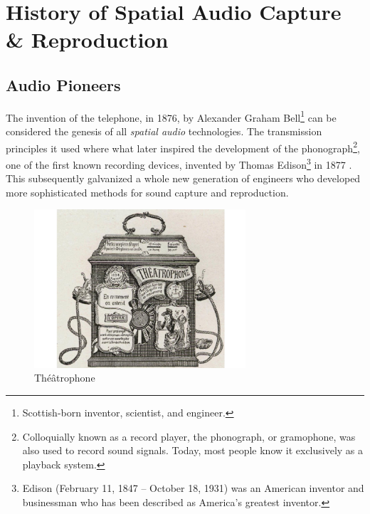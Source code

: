 \section{History of Spatial Audio Capture \& Reproduction}

\subsection{Audio Pioneers} \label{subsec:audio_pioneers}

The invention of the telephone, in 1876, by Alexander Graham Bell\footnote{Scottish-born inventor, scientist, and engineer.} \cite{grosvenor2016alexander} can be considered the genesis of all \textit{spatial audio} technologies. The transmission principles it used where what later inspired the development of the phonograph\footnote{Colloquially known as a record player, the phonograph, or gramophone, was also used to record sound signals. Today, most people know it exclusively as a playback system.}, one of the first known recording devices, invented by Thomas Edison\footnote{Edison (February 11, 1847 – October 18, 1931) was an American inventor and businessman who has been described as America's greatest inventor.} in 1877 \cite{gitelman1999scripts}. This subsequently galvanized a whole new generation of engineers who developed more sophisticated methods for sound capture and reproduction. 

\begin{figure}[ht]%
\centering
\includegraphics[width=0.7\textwidth]{img/theatrophone.jpeg} 
\caption{Théâtrophone \cite{theatrophonepic}}
\label{fig:theatrophone}
\end{figure}

